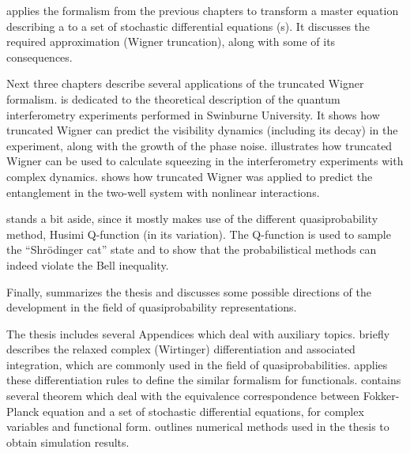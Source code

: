  applies the formalism from the previous chapters to transform a master equation describing a  to a set of stochastic differential equations (s).
It discusses the required approximation (Wigner truncation), along with some of its consequences.

Next three chapters describe several applications of the truncated Wigner formalism.
 is dedicated to the theoretical description of the quantum interferometry experiments performed in Swinburne University.
It shows how truncated Wigner can predict the visibility dynamics (including its decay) in the experiment, along with the growth of the phase noise.
 illustrates how truncated Wigner can be used to calculate squeezing in the interferometry experiments with complex dynamics.
 shows how truncated Wigner was applied to predict the entanglement in the two-well system with nonlinear interactions.

 stands a bit aside, since it mostly makes use of the different quasiprobability method, Husimi Q-function (in its  variation).
The Q-function is used to sample the ``Shr\"{o}dinger cat'' state and to show that the probabilistical methods can indeed violate the Bell inequality.

Finally,  summarizes the thesis and discusses some possible directions of the development in the field of quasiprobability representations.

The thesis includes several Appendices which deal with auxiliary topics.
 briefly describes the relaxed complex (Wirtinger) differentiation and associated integration, which are commonly used in the field of quasiprobabilities.
 applies these differentiation rules to define the similar formalism for functionals.
 contains several theorem which deal with the equivalence correspondence between Fokker-Planck equation and a set of stochastic differential equations, for complex variables and functional form.
 outlines numerical methods used in the thesis to obtain simulation results.
